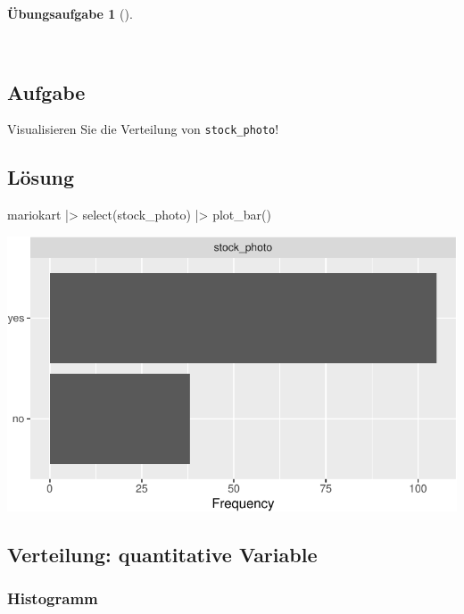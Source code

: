 \documentclass[
  a4paper,
  DIV=11]{scrreprt}
\newenvironment{Shaded}{\begin{snugshade}}{\end{snugshade}}
\newcommand{\FunctionTok}[1]{\textcolor[rgb]{0.28,0.35,0.67}{#1}}
\newcommand{\NormalTok}[1]{\textcolor[rgb]{0.00,0.23,0.31}{#1}}
\newcommand{\SpecialCharTok}[1]{\textcolor[rgb]{0.37,0.37,0.37}{#1}}
\theoremstyle{definition}
\newtheorem{exercise}{Übungsaufgabe}[chapter]
\theoremstyle{definition}
\theoremstyle{definition}
\theoremstyle{remark}
\begin{document}
\begin{exercise}[]\protect\hypertarget{exr-balken}{}\label{exr-balken}

~

\subsection{Aufgabe}

Visualisieren Sie die Verteilung von \texttt{stock\_photo}!

\subsection{Lösung}

\begin{Shaded}
\begin{Highlighting}[]
\NormalTok{mariokart }\SpecialCharTok{|\textgreater{}} 
  \FunctionTok{select}\NormalTok{(stock\_photo) }\SpecialCharTok{|\textgreater{}} 
  \FunctionTok{plot\_bar}\NormalTok{()}
\end{Highlighting}
\end{Shaded}

\includegraphics{040-verbildlichen_files/figure-pdf/unnamed-chunk-9-1.pdf}

\end{exercise}

\subsection{Verteilung: quantitative
Variable}\label{verteilung-quantitative-variable}

\subsubsection{Histogramm}\label{histogramm}
\end{document}

